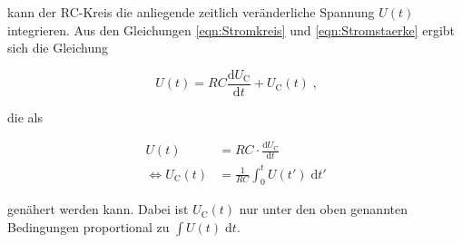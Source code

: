 kann der RC-Kreis die anliegende zeitlich veränderliche Spannung $U(t)$ integrieren.
Aus den Gleichungen \eqref{eqn:Stromkreis} und \eqref{eqn:Stromstaerke} ergibt sich die
Gleichung 

\begin{equation}
    U(t) = RC \frac{\text{d}U_\text{C}}{\text{d}t} + U_\text{C}(t) \; \text{,}
\end{equation}

die als

\begin{align}
    U(t) &= RC \cdot \frac{\text{d}U_\text{C}}{\text{d}t} \\
    \iff U_\text{C}(t) &= \frac{1}{RC} \int^t_0 U(t') \; \text{d} t'
\end{align}

genähert werden kann. Dabei ist $U_\text{C}(t)$ nur unter den oben genannten Bedingungen
proportional zu $\int U(t) \; \text{d}t$.

